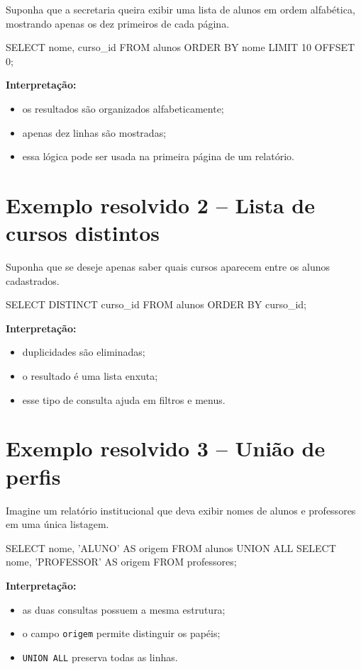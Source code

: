 Suponha que a secretaria queira exibir uma lista de alunos em ordem alfabética, mostrando apenas os dez primeiros de cada página.

\begin{sqlcode}
SELECT nome, curso_id
FROM alunos
ORDER BY nome
LIMIT 10 OFFSET 0;
\end{sqlcode}

\textbf{Interpretação:}
\begin{itemize}
    \item os resultados são organizados alfabeticamente;
    \item apenas dez linhas são mostradas;
    \item essa lógica pode ser usada na primeira página de um relatório.
\end{itemize}

\section{Exemplo resolvido 2 -- Lista de cursos distintos}

Suponha que se deseje apenas saber quais cursos aparecem entre os alunos cadastrados.

\begin{sqlcode}
SELECT DISTINCT curso_id
FROM alunos
ORDER BY curso_id;
\end{sqlcode}

\textbf{Interpretação:}
\begin{itemize}
    \item duplicidades são eliminadas;
    \item o resultado é uma lista enxuta;
    \item esse tipo de consulta ajuda em filtros e menus.
\end{itemize}

\section{Exemplo resolvido 3 -- União de perfis}

Imagine um relatório institucional que deva exibir nomes de alunos e professores em uma única listagem.

\begin{sqlcode}
SELECT nome, 'ALUNO' AS origem
FROM alunos
UNION ALL
SELECT nome, 'PROFESSOR' AS origem
FROM professores;
\end{sqlcode}

\textbf{Interpretação:}
\begin{itemize}
    \item as duas consultas possuem a mesma estrutura;
    \item o campo \texttt{origem} permite distinguir os papéis;
    \item \texttt{UNION ALL} preserva todas as linhas.
\end{itemize}

